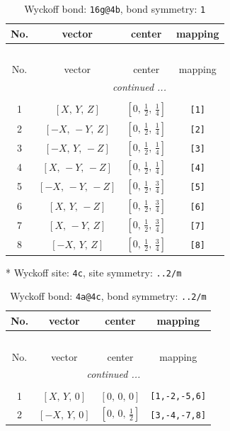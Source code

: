 \documentclass[fleqn,8pt]{jsarticle}
\begin{document}
\begin{longtable}{cccc}
\caption{Wyckoff bond: {\tt 16g@4b}, bond symmetry: {\tt 1}}
 \\
 \hline \hline
No. & vector & center & mapping \\ \hline \endfirsthead

\multicolumn{3}{l}{\tablename\ \thetable{}} \\
 \hline \hline
No. & vector & center & mapping \\ \hline \endhead

 \hline \hline
\multicolumn{3}{r}{\footnotesize\it continued ...} \\ \endfoot

 \hline \hline
\multicolumn{3}{r}{} \\ \endlastfoot

1 & $\left[ X,\, Y,\, Z \right]$ & $\left[ 0,\, \frac{1}{2},\, \frac{1}{4} \right]$ & {\tt [1]} \\ \hline
2 & $\left[ - X,\, - Y,\, Z \right]$ & $\left[ 0,\, \frac{1}{2},\, \frac{1}{4} \right]$ & {\tt [2]} \\ \hline
3 & $\left[ - X,\, Y,\, - Z \right]$ & $\left[ 0,\, \frac{1}{2},\, \frac{1}{4} \right]$ & {\tt [3]} \\ \hline
4 & $\left[ X,\, - Y,\, - Z \right]$ & $\left[ 0,\, \frac{1}{2},\, \frac{1}{4} \right]$ & {\tt [4]} \\ \hline
5 & $\left[ - X,\, - Y,\, - Z \right]$ & $\left[ 0,\, \frac{1}{2},\, \frac{3}{4} \right]$ & {\tt [5]} \\ \hline
6 & $\left[ X,\, Y,\, - Z \right]$ & $\left[ 0,\, \frac{1}{2},\, \frac{3}{4} \right]$ & {\tt [6]} \\ \hline
7 & $\left[ X,\, - Y,\, Z \right]$ & $\left[ 0,\, \frac{1}{2},\, \frac{3}{4} \right]$ & {\tt [7]} \\ \hline
8 & $\left[ - X,\, Y,\, Z \right]$ & $\left[ 0,\, \frac{1}{2},\, \frac{3}{4} \right]$ & {\tt [8]} \\
\end{longtable}
* Wyckoff site: {\tt 4c}, site symmetry: {\tt ..2/m}
\renewcommand{\arraystretch}{1.2}
\begin{longtable}{cccc}
\caption{Wyckoff bond: {\tt 4a@4c}, bond symmetry: {\tt ..2/m}}
 \\
 \hline \hline
No. & vector & center & mapping \\ \hline \endfirsthead

\multicolumn{3}{l}{\tablename\ \thetable{}} \\
 \hline \hline
No. & vector & center & mapping \\ \hline \endhead

 \hline \hline
\multicolumn{3}{r}{\footnotesize\it continued ...} \\ \endfoot

 \hline \hline
\multicolumn{3}{r}{} \\ \endlastfoot

1 & $\left[ X,\, Y,\, 0 \right]$ & $\left[ 0,\, 0,\, 0 \right]$ & {\tt [1,-2,-5,6]} \\ \hline
2 & $\left[ - X,\, Y,\, 0 \right]$ & $\left[ 0,\, 0,\, \frac{1}{2} \right]$ & {\tt [3,-4,-7,8]} \\
\end{longtable}
\end{document}
